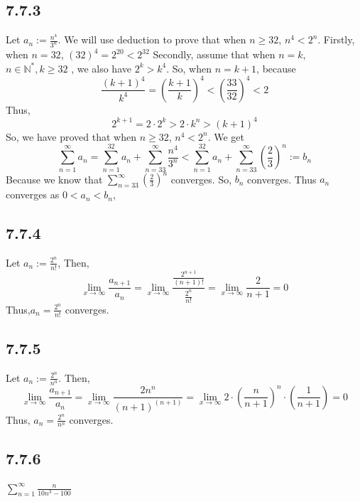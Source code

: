 \documentclass[11pt,twoside,a4paper]{article}
\begin{document}
\subsection{7.7.3}
Let $\displaystyle a_{n}:=\frac{n^4}{3^n}$. We will use deduction to 
prove that when $n \ge 32$, $n^4<2^n$.
\newline
Firstly, when $n=32$, $(32)^4=2^{20}<2^{32}$
\newline
Secondly, assume that when $n=k$,$n \in \mathbb{N}^*,k\ge 32$
, we also have $2^k>k^4$.
\newline
So, when $n=k+1$, because
$$\frac{(k+1)^4}{k^4}=(\frac{k+1}{k})^4<(\frac{33}{32})^4<2$$
Thus, 
$$2^{k+1}=2\cdot 2^{k}>2\cdot k^n >(k+1)^4$$
So, we have proved that when $n \ge 32$, $n^4<2^n$.
\newline
We get 
$$\sum_{n = 1}^{\infty} a_{n} =\sum_{n = 1}^{32} a_{n} 
+\sum_{n = 33}^{\infty}\frac{n^4}{3^n}
<\sum_{n = 1}^{32}a_{n}+
\sum_{n = 33}^{\infty} (\frac{2}{3})^n:=b_{n} $$
\newline
Because we know that $\displaystyle \sum_{n = 33}^{\infty} (\frac{2}{3})^n$
converges.
So, $b_{n}$ converges. Thus $a_{n}$ converges as $0<a_{n}<b_{n}$,

\subsection{7.7.4}
Let $\displaystyle a_{n}:=\frac{2^n}{n!}$, Then, 
$$\displaystyle 
\lim_{x \to \infty} \frac{a_{n+1}}{a_{n}}
=\lim_{x \to \infty}\frac{\frac{2^{n+1}}{(n+1)!}}{\frac{2^n}{n!}} 
=\lim_{x \to \infty} \frac{2}{n+1}=0$$
Thus,$\displaystyle a_{n}=\frac{2^n}{n!}$ converges.

\subsection{7.7.5}
Let $\displaystyle a_{n}:=\frac{2^n}{n^n}$. Then,
$$\displaystyle \lim_{x \to \infty} \frac{a_{n+1}}{a_{n}}
=\lim_{x \to \infty} \frac{2n^n}{(n+1)^(n+1)}
=\lim_{x \to \infty} 2\cdot(\frac{n}{n+1})^n \cdot (\frac{1}{n+1})
=0 $$
Thus, $\displaystyle a_{n}=\frac{2^n}{n^n}$ converges.

\subsection{7.7.6}
$\displaystyle \sum_{n = 1}^{\infty} \frac{n}{10n^3-100} $
\end{document}
